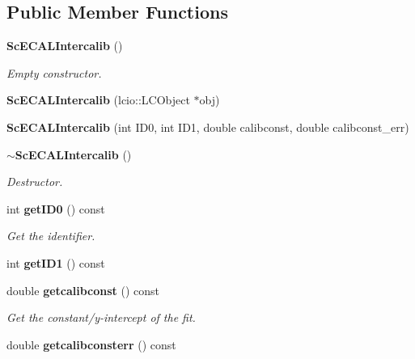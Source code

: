 \subsection*{Public Member Functions}
\begin{DoxyCompactItemize}
\item 
{\bf Sc\-E\-C\-A\-L\-Intercalib} ()\label{classCALICE_1_1ScECALIntercalib_ab9a903d872bc35e9cdfc4c4a8a5a134d}

\begin{DoxyCompactList}\small\item\em Empty constructor. \end{DoxyCompactList}\item 
{\bfseries Sc\-E\-C\-A\-L\-Intercalib} (lcio\-::\-L\-C\-Object $\ast$obj)\label{classCALICE_1_1ScECALIntercalib_ad302212d0d7491ed08afcf3708490beb}

\item 
{\bfseries Sc\-E\-C\-A\-L\-Intercalib} (int I\-D0, int I\-D1, double calibconst, double calibconst\-\_\-err)\label{classCALICE_1_1ScECALIntercalib_ac1abf38ae2b90662ffd06d452cdad3b3}

\item 
{\bf $\sim$\-Sc\-E\-C\-A\-L\-Intercalib} ()\label{classCALICE_1_1ScECALIntercalib_a8997a10c987868dfbf62c1716bcfefe2}

\begin{DoxyCompactList}\small\item\em Destructor. \end{DoxyCompactList}\item 
int {\bf get\-I\-D0} () const \label{classCALICE_1_1ScECALIntercalib_a2c7ed7983127492a1cac7e089b654545}

\begin{DoxyCompactList}\small\item\em Get the identifier. \end{DoxyCompactList}\item 
int {\bfseries get\-I\-D1} () const \label{classCALICE_1_1ScECALIntercalib_a007d4db7c51419e050350189d8ad3f2b}

\item 
double {\bf getcalibconst} () const \label{classCALICE_1_1ScECALIntercalib_af366c4fbf475af5d858f3df7c159ec61}

\begin{DoxyCompactList}\small\item\em Get the constant/y-\/intercept of the fit. \end{DoxyCompactList}\item 
double {\bf getcalibconsterr} () const \label{classCALICE_1_1ScECALIntercalib_aa373eb5069733673817145fc7ae69391}


\end{DoxyCompactItemize}
